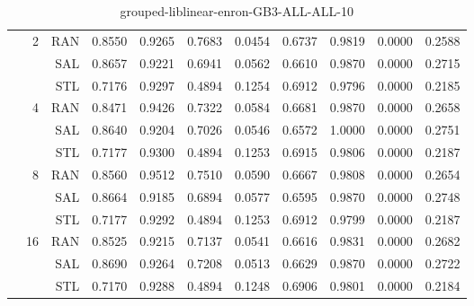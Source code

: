 \begin{center}
\begin{table}[htbp]
\begin{tabular}{ | r | r | r | r | r | r | r | r | r | r | r |}
 & \multirow{3}{*}{2} & RAN & 0.8550 & 0.9265 & 0.7683 & 0.0454 & 0.6737 & 0.9819 & 0.0000 & 0.2588\\ \cline{3-11}
 &   & SAL & 0.8657 & 0.9221 & 0.6941 & 0.0562 & 0.6610 & 0.9870 & 0.0000 & 0.2715\\ \cline{3-11}
 &   & STL & 0.7176 & 0.9297 & 0.4894 & 0.1254 & 0.6912 & 0.9796 & 0.0000 & 0.2185\\ \cline{2-11}
 & \multirow{3}{*}{4} & RAN & 0.8471 & 0.9426 & 0.7322 & 0.0584 & 0.6681 & 0.9870 & 0.0000 & 0.2658\\ \cline{3-11}
 &   & SAL & 0.8640 & 0.9204 & 0.7026 & 0.0546 & 0.6572 & 1.0000 & 0.0000 & 0.2751\\ \cline{3-11}
 &   & STL & 0.7177 & 0.9300 & 0.4894 & 0.1253 & 0.6915 & 0.9806 & 0.0000 & 0.2187\\ \cline{2-11}
 & \multirow{3}{*}{8} & RAN & 0.8560 & 0.9512 & 0.7510 & 0.0590 & 0.6667 & 0.9808 & 0.0000 & 0.2654\\ \cline{3-11}
 &   & SAL & 0.8664 & 0.9185 & 0.6894 & 0.0577 & 0.6595 & 0.9870 & 0.0000 & 0.2748\\ \cline{3-11}
 &   & STL & 0.7177 & 0.9292 & 0.4894 & 0.1253 & 0.6912 & 0.9799 & 0.0000 & 0.2187\\ \cline{2-11}
 & \multirow{3}{*}{16} & RAN & 0.8525 & 0.9215 & 0.7137 & 0.0541 & 0.6616 & 0.9831 & 0.0000 & 0.2682\\ \cline{3-11}
 &   & SAL & 0.8690 & 0.9264 & 0.7208 & 0.0513 & 0.6629 & 0.9870 & 0.0000 & 0.2722\\ \cline{3-11}
 &   & STL & 0.7170 & 0.9288 & 0.4894 & 0.1248 & 0.6906 & 0.9801 & 0.0000 & 0.2184\\ \cline{2-11}
\hline
\end{tabular}
\caption{grouped-liblinear-enron-GB3-ALL-ALL-10}
\end{table}
\end{center}

